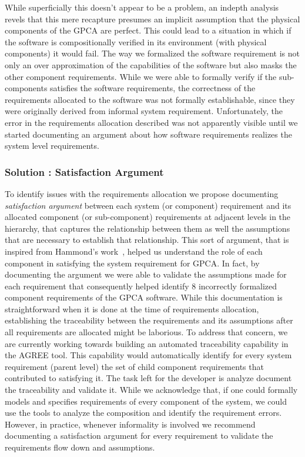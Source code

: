 While superficially this doesn't appear to be a problem, an indepth analysis revels that this mere recapture presumes an implicit assumption that the  physical components of the GPCA are perfect. This could lead to a situation in which if the software is compositionally verified in its environment (with physical components) it would fail. The way we formalized the software requirement is not only an over approximation of the capabilities of the software but also masks the other component requirements. While we were able to formally verify if the sub-components satisfies the software requirements, the correctness of the requirements allocated to the software was not formally establishable, since they were originally derived from informal system requirement. Unfortunately, the error in the requirements allocation described was not apparently visible until we started documenting an argument about how software requirements realizes the system level requirements.

\subsubsection {Solution : Satisfaction Argument}
To identify issues with the requirements allocation we propose documenting \emph{satisfaction argument} between each system (or component) requirement and its allocated component (or sub-component) requirements at adjacent levels in the hierarchy, that captures the relationship between them as well the assumptions that are necessary to establish that relationship. This sort of argument, that is inspired from Hammond's work~\cite{Hammond01:WiW}, helped us understand the role of each component in satisfying the system requirement for GPCA. In fact, by documenting the argument we were able to validate the assumptions made for each requirement that consequently helped identify 8 incorrectly formalized component requirements of the GPCA software. While this documentation is straightforward when it is done at the time of requirements allocation, establishing the traceability between the requirements and its assumptions after all requirements are allocated might be laborious. To address that concern, we are currently working towards building an automated traceability capability in the AGREE tool. This capability would automatically identify for every system requirement (parent level) the set of child component requirements that contributed to satisfying it. The task left for the developer is analyze document the traceability and validate it. While we acknowledge that, if one could formally models and specifies requirements of every component of the system, we could use the tools to analyze the composition and identify the requirement errors. However, in practice, whenever informality is involved we recommend documenting a satisfaction argument for every requirement to validate the requirements flow down and assumptions. 